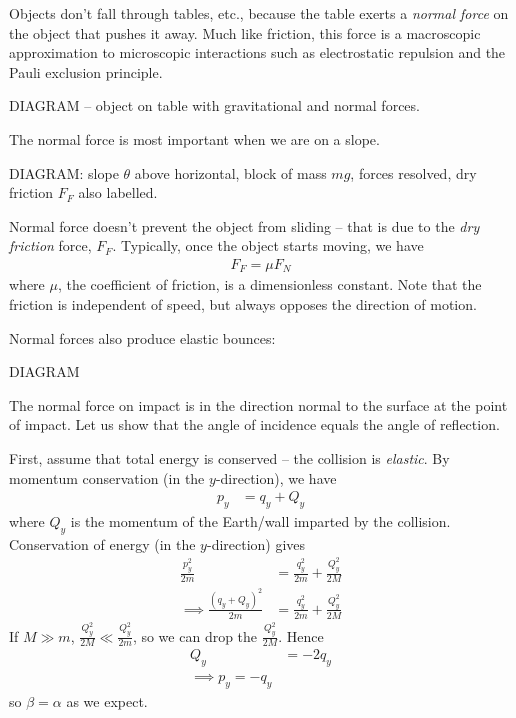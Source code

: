 \documentclass{../template/note}
\begin{document}
    Objects don't fall through tables, etc., because the table exerts a \emph{normal force} on the object that pushes it away. Much like friction, this force is a macroscopic approximation to microscopic interactions such as electrostatic repulsion and the Pauli exclusion principle.

    DIAGRAM -- object on table with gravitational and normal forces.

    The normal force is most important when we are on a slope.

    DIAGRAM: slope \(\theta\) above horizontal, block of mass \(mg\), forces resolved, dry friction \(F_F\) also labelled.

    Normal force doesn't prevent the object from sliding -- that is due to the \emph{dry friction} force, \(F_F\). Typically, once the object starts moving, we have
    \begin{align*}
        F_F = \mu F_N
    \end{align*}
    where \(\mu\), the coefficient of friction, is a dimensionless constant. Note that the friction is independent of speed, but always opposes the direction of motion.

    Normal forces also produce elastic bounces:

    DIAGRAM

    The normal force on impact is in the direction normal to the surface at the point of impact. Let us show that the angle of incidence equals the angle of reflection.

    First, assume that total energy is conserved -- the collision is \emph{elastic}. By momentum conservation (in the \(y\)-direction), we have
    \begin{align*}
        p_y &= q_y + Q_y
    \end{align*}
    where \(Q_y\) is the momentum of the Earth/wall imparted by the collision. Conservation of energy (in the \(y\)-direction) gives
    \begin{align*}
        \frac{p_y^2}{2m} &= \frac{q_y^2}{2m} + \frac{Q_y^2}{2M} \\
        \implies \frac{(q_y+Q_y)^2}{2m} &= \frac{q_y^2}{2m} + \frac{Q_y^2}{2M}
    \end{align*}
    If \(M \gg m\), \(\frac{Q_y^2}{2M} \ll \frac{Q_y^2}{2m}\), so we can drop the \(\frac{Q_y^2}{2M}\). Hence
    \begin{align*}
        Q_y &= -2q_y \\
        \implies p_y = -q_y
    \end{align*}
    so \(\beta = \alpha\) as we expect.
\end{document}
